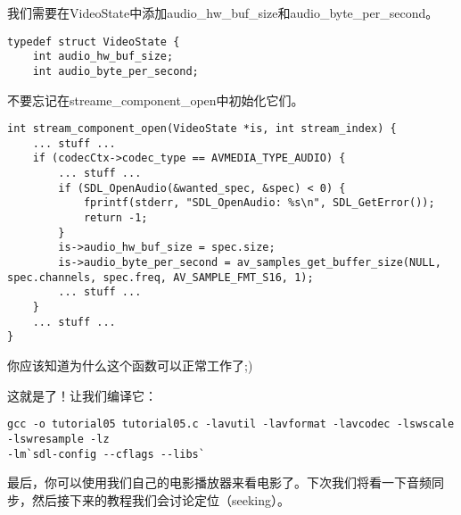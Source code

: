 我们需要在VideoState中添加audio_hw_buf_size和audio_byte_per_second。

\begin{lstlisting}
typedef struct VideoState {
    int audio_hw_buf_size;
    int audio_byte_per_second;
\end{lstlisting}

不要忘记在streame_component_open中初始化它们。

\begin{lstlisting}
int stream_component_open(VideoState *is, int stream_index) {
    ... stuff ...
    if (codecCtx->codec_type == AVMEDIA_TYPE_AUDIO) {
        ... stuff ...
        if (SDL_OpenAudio(&wanted_spec, &spec) < 0) {
            fprintf(stderr, "SDL_OpenAudio: %s\n", SDL_GetError());
            return -1;
        }
        is->audio_hw_buf_size = spec.size;
        is->audio_byte_per_second = av_samples_get_buffer_size(NULL, spec.channels, spec.freq, AV_SAMPLE_FMT_S16, 1);
        ... stuff ...
    }
    ... stuff ...
}
\end{lstlisting}

你应该知道为什么这个函数可以正常工作了;)

这就是了！让我们编译它：

\begin{lstlisting}
gcc -o tutorial05 tutorial05.c -lavutil -lavformat -lavcodec -lswscale -lswresample -lz
-lm`sdl-config --cflags --libs`
\end{lstlisting}

最后，你可以使用我们自己的电影播放器来看电影了。下次我们将看一下音频同步，然后接下来的教程我们会讨论定位（seeking）。
